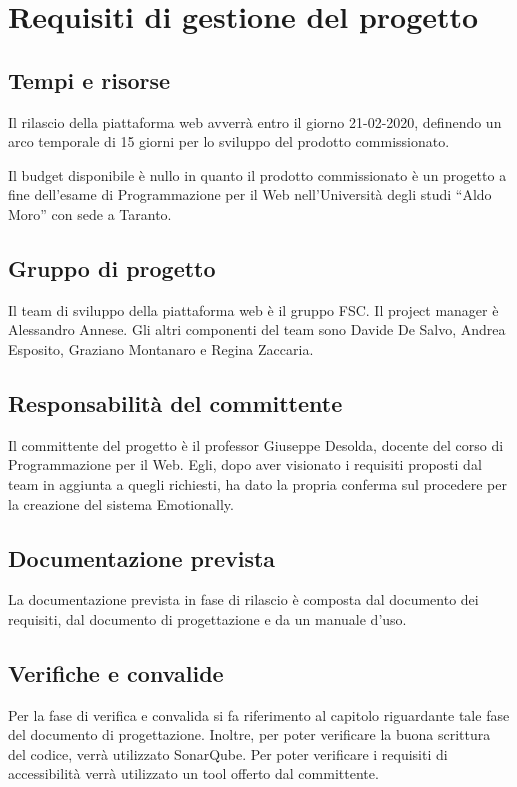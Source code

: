 \chapter{Requisiti di gestione del progetto}
\section{Tempi e risorse}
Il rilascio della piattaforma web avverrà entro il giorno 21-02-2020, definendo 
un arco temporale di 15 giorni per lo sviluppo del prodotto commissionato.

Il budget disponibile è nullo in quanto il prodotto commissionato è un progetto 
a fine dell'esame di Programmazione per il Web nell'Università degli studi 
``Aldo Moro'' con sede a Taranto.

\section{Gruppo di progetto}
Il team di sviluppo della piattaforma web è il gruppo FSC. Il project manager è 
Alessandro Annese. Gli altri componenti del team sono Davide De Salvo, Andrea 
Esposito, Graziano Montanaro e Regina Zaccaria.

\section{Responsabilità del committente}
Il committente del progetto è il professor Giuseppe Desolda, docente del corso 
di Programmazione per il Web. Egli, dopo aver visionato i requisiti proposti 
dal team in aggiunta a quegli richiesti, ha dato la propria conferma sul 
procedere per la creazione del sistema Emotionally.

\section{Documentazione prevista}
La documentazione prevista in fase di rilascio è composta dal documento dei 
requisiti, dal documento di progettazione e da un manuale d'uso.

\section{Verifiche e convalide}
Per la fase di verifica e convalida si fa riferimento al capitolo riguardante 
tale fase del documento di progettazione. Inoltre, per poter verificare la 
buona scrittura del codice, verrà utilizzato SonarQube. Per poter verificare i 
requisiti di accessibilità verrà utilizzato un tool offerto dal committente.


